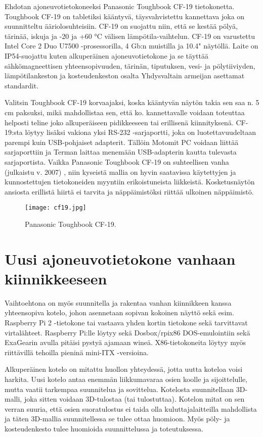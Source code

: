 Ehdotan ajoneuvotietokoneeksi Panasonic Toughbook CF-19 tietokonetta. Toughbook CF-19 on tabletiksi kääntyvä, täysvahvistettu kannettava joka on suunnitteltu ääriolosuhteisiin. CF-19 on suojattu niin, että se kestää pölyä, tärinää, iskuja ja -20 ja +60 °C välisen lämpötila-vaihtelun. CF-19 on varustettu Intel Core 2 Duo U7500 -prosessorilla, 4 Gb:n muistilla ja 10.4" näytöllä. Laite on IP54-suojattu kuten alkuperäinen ajoneuvotietokone ja se täyttää sähkömagneettisen yhteensopivuuden, tärinän, tiputuksen, vesi- ja pölytiiviyden, lämpötilankeston ja kosteudenkeston osalta Yhdysvaltain armeijan asettamat standardit. \cite{cf19}

Valitsin Toughbook CF-19 korvaajaksi, koska kääntyvän näytön takia sen saa n. 5 cm paksuksi, mikä mahdollistaa sen, että ko. kannettavalle voidaan toteuttaa helposti teline joko alkuperäiseen pidikkeeseen tai erillisenä kiinnityksenä. CF-19:sta löytyy lisäksi vakiona yksi RS-232 -sarjaportti, joka on luotettavuudeltaan parempi kuin USB-pohjaiset adapterit. Tällöin Motomit PC voidaan liittää sarjaporttiin ja Terman laittaa menemään USB-adapterin kautta tulevasta sarjaportista. Vaikka Panasonic Toughbook CF-19 on suhteellisen vanha (julkaistu v. 2007) \cite{cf19}, niin kyseistä mallia on hyvin saatavissa käytettyjen ja kunnostettujen tietokoneiden myyntiin erikoistuneista liikkeistä. Kosketusnäytön ansiosta erillistä hiirtä ei tarvita ja näppäimistöksi riittää ulkoinen näppäimistö.

\begin{figure}[H]
\centering
\texttt{[image: cf19.jpg]}
\caption{Panasonic Toughbook CF-19.}
\end{figure}

\section{Uusi ajoneuvotietokone vanhaan kiinnikkeeseen}

Vaihtoehtona on myös suunnitella ja rakentaa vanhan kiinnikkeen kanssa yhteensopiva kotelo, johon asennetaan sopivan kokoinen näyttö sekä esim. Raspberry Pi 2 -tietokone tai vastaava yhden kortin tietokone sekä tarvittavat virtalähteet. Raspberry Pi:lle löytyy sekä Dosbox/rpix86 DOS-emulointiin sekä ExaGearin avulla pitäisi pystyä ajamaan wineä. X86-tietokoneita löytyy myös riittävillä tehoilla pieninä mini-ITX -versioina.

Alkuperäinen kotelo on mitattu huollon yhteydessä, jotta uutta koteloa voisi harkita. Uusi kotelo antaa enemmän liikkumavaraa osien koolle ja sijoittelulle, mutta vaatii tarkempaa suunnitelua ja sovittelua. Kotelosta suunnitellaan 3D-malli, joka sitten voidaan 3D-tulostaa (tai tulostuttaa). Kotelon mitat on sen verran suuria, että osien suoratulostus ei taida olla kuluttajalaitteilla mahdollista ja täten 3D-mallia suunnitellessa se tulee ottaa huomioon. Myös pöly- ja kosteudenkesto tulee huomioida suunnittelussa ja toteutuksessa.

